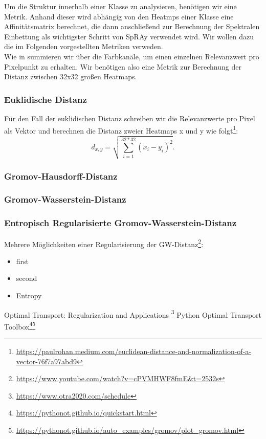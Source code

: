 \documentclass[twoside, 12pt,a4paper]{article}
\numberwithin{equation}{section}
\begin{document}
	Um die Struktur innerhalb einer Klasse zu analysieren, benötigen wir eine Metrik.
	Anhand dieser wird abhängig von den Heatmps einer Klasse eine Affinitätsmatrix berechnet, die dann anschließend zur Berechnung der Spektralen Einbettung als wichtigster Schritt von SpRAy verwendet wird. Wir wollen dazu die im Folgenden vorgestellten Metriken verweden.\\
	Wie in \cite{imagenet_unhansed_v1} summieren wir über die Farbkanäle, um einen einzelnen Relevanzwert pro Pixelpunkt zu erhalten. Wir benötigen also eine Metrik zur Berechnung der Distanz zwischen 32x32 großen Heatmaps.
	
	\subsubsection{Euklidische Distanz}
	Für den Fall der euklidischen Distanz schreiben wir die Relevanzwerte pro Pixel als Vektor und berechnen die Distanz zweier Heatmaps x und y wie folgt\footnote{\url{https://paulrohan.medium.com/euclidean-distance-and-normalization-of-a-vector-76f7a97abd9}}:
	$$ d_{x,y} = \sqrt{\sum_{i=1}^{32 * 32}{(x_i -y_i)^2}}.$$
	
	\subsubsection{Gromov-Hausdorff-Distanz}
	\subsubsection{Gromov-Wasserstein-Distanz}
	\subsubsection{Entropisch Regularisierte Gromov-Wasserstein-Distanz}
	Mehrere Möglichkeiten einer Regularisierung der GW-Distanz\footnote{\url{https://www.youtube.com/watch?v=cPVMHWF8fmE&t=2532s}}:
	\begin{itemize}
		\item first\\
		\item second \\
		\item Entropy
	\end{itemize} 
	
	Optimal Transport: Regularization and Applications
	\footnote{\url{https://www.otra2020.com/schedule}}
	Python Optimal Transport Toolbox\footnote{\url{https://pythonot.github.io/quickstart.html}}\footnote{\url{https://pythonot.github.io/auto_examples/gromov/plot_gromov.html}}
	
\end{document}
